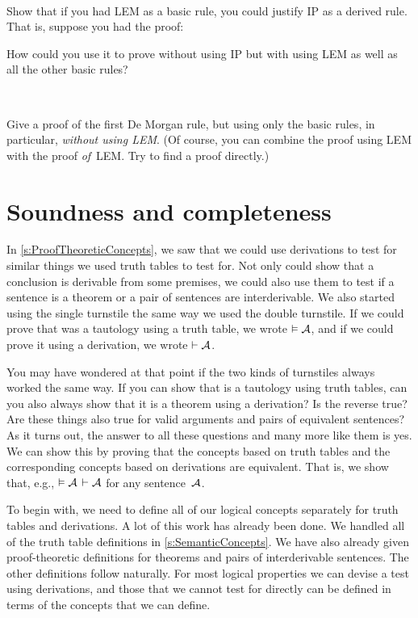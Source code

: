 \

\problempart
Show that if you had LEM as a basic rule, you could justify IP as a derived rule. That is, suppose you had the proof:
\begin{fitchproof}
  \open
  \AS
  \close
\end{fitchproof}
How could you use it to prove  without using IP but with using LEM as well as all the other basic rules?

\

\problempart
Give a proof of the first De Morgan rule, but using only the basic rules, in particular, \emph{without using LEM}. (Of course, you can combine the proof using LEM with the proof \emph{of}~LEM. Try to find a proof directly.)

\chapter{Soundness and completeness}
\label{sec:soundness_and_completeness}

In \cref{s:ProofTheoreticConcepts}, we saw that we could use
derivations to test for similar things we used truth tables to test
for. Not only could show that a conclusion is derivable from some
premises, we could also use them to test if a sentence is a theorem or
a pair of sentences are interderivable. We also started using the
single turnstile the same way we used the double turnstile. If we
could prove that  was a tautology using a truth table, we
wrote $\vDash \mathcal{A}$, and if we could prove it using a
derivation, we wrote $\vdash \mathcal{A}$.

You may have wondered at that point if the two kinds of turnstiles
always worked the same way. If you can show that  is a
tautology using truth tables, can you also always show that it is a
theorem using a derivation? Is the reverse true? Are these things also
true for valid arguments and pairs of equivalent sentences? As it
turns out, the answer to all these questions and many more like them
is yes. We can show this by proving that the concepts based on truth
tables and the corresponding concepts based on derivations are
equivalent. That is, we show that, e.g., $\vDash \mathcal{A}$ \ifeff{}
$\vdash \mathcal{A}$ for any sentence~$\mathcal{A}$.

To begin with, we need to define all of our logical concepts separately for truth tables and derivations. A lot of this work has already been done. We handled all of the truth table definitions in \cref{s:SemanticConcepts}. We have also already given proof-theoretic definitions for theorems and pairs of interderivable sentences. The other definitions follow naturally. For most logical properties we can devise a test using derivations, and those that we cannot test for directly can be defined in terms of the concepts that we can define.

